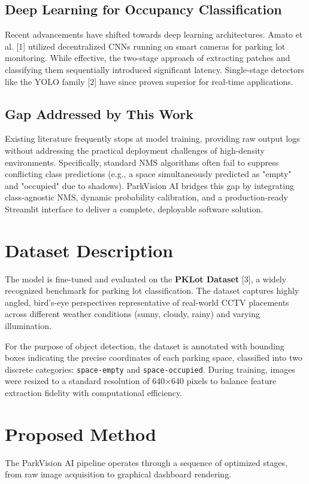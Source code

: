\documentclass[conference]{IEEEtran}
\begin{document}
\subsection{Deep Learning for Occupancy Classification}
Recent advancements have shifted towards deep learning architectures. Amato et al. [1] utilized decentralized CNNs running on smart cameras for parking lot monitoring. While effective, the two-stage approach of extracting patches and classifying them sequentially introduced significant latency. Single-stage detectors like the YOLO family [2] have since proven superior for real-time applications.

\subsection{Gap Addressed by This Work}
Existing literature frequently stops at model training, providing raw output logs without addressing the practical deployment challenges of high-density environments. Specifically, standard NMS algorithms often fail to suppress conflicting class predictions (e.g., a space simultaneously predicted as "empty" and "occupied" due to shadows). ParkVision AI bridges this gap by integrating class-agnostic NMS, dynamic probability calibration, and a production-ready Streamlit interface to deliver a complete, deployable software solution.

\section{Dataset Description}
The model is fine-tuned and evaluated on the \textbf{PKLot Dataset} [3], a widely recognized benchmark for parking lot classification. The dataset captures highly angled, bird's-eye perspectives representative of real-world CCTV placements across different weather conditions (sunny, cloudy, rainy) and varying illumination. 

For the purpose of object detection, the dataset is annotated with bounding boxes indicating the precise coordinates of each parking space, classified into two discrete categories: \texttt{space-empty} and \texttt{space-occupied}. During training, images were resized to a standard resolution of 640$\times$640 pixels to balance feature extraction fidelity with computational efficiency.

\section{Proposed Method}
The ParkVision AI pipeline operates through a sequence of optimized stages, from raw image acquisition to graphical dashboard rendering.
\end{document}

